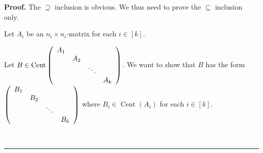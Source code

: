 \documentclass[numbers=enddot,12pt,final,onecolumn,notitlepage]{scrartcl}%
\numberwithin{exer}{subsection}
\theoremstyle{definition}
\newenvironment{proof}[1][Proof]{\noindent\textbf{#1.} }{\ \rule{0.5em}{0.5em}}
\begin{document}
\begin{proof}
The $\supseteq$ inclusion is obvious. We thus need to prove the $\subseteq$
inclusion only.

Let $A_{i}$ be an $n_{i}\times n_{i}$-matrix for each $i\in\left[  k\right]  $.

Let $B\in\operatorname*{Cent}\left(
\begin{array}
[c]{cccc}%
A_{1} &  &  & \\
& A_{2} &  & \\
&  & \ddots & \\
&  &  & A_{k}%
\end{array}
\right)  $. We want to show that $B$ has the form $\left(
\begin{array}
[c]{cccc}%
B_{1} &  &  & \\
& B_{2} &  & \\
&  & \ddots & \\
&  &  & B_{k}%
\end{array}
\right)  $ where $B_{i}\in\operatorname*{Cent}\left(  A_{i}\right)  $ for each
$i\in\left[  k\right]  $.


\end{proof}
\end{document}
